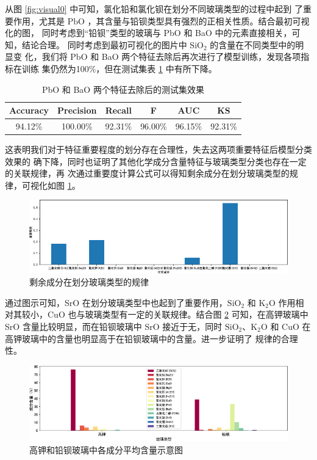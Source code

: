 \documentclass[withoutpreface,bwprint]{cumcmthesis} %
\begin{document}
从图 \ref{fig:visual0} 中可知，氯化铅和氯化钡在划分不同玻璃类型的过程中起到
了重要作用，尤其是
$\mathrm{PbO}$ ，其含量与铅钡类型具有强烈的正相关性质。结合最初可视化的图，
同时考虑到“铅钡”类型的玻璃与 PbO 和 BaO 中的元素直接相关，可知，结论合理。
同时考虑到最初可视化的图片中 $\mathrm{SiO_2}$ 的含量在不同类型中的明显变
化，我们将 PbO 和 BaO 两个特征去除后再次进行了模型训练，发现各项指标在训练
集仍然为100\%，但在测试集表 \ref{tab:test1} 中有所下降。
\begin{table}[!htb]
    \centering
    \begin{tabular}{|c|c|c|c|c|c|}
        \hline
        Accuracy & Precision & Recall  & F       & AUC     & KS      \\
        \hline
        94.12\%  & 100.00\%  & 92.31\% & 96.00\% & 96.15\% & 92.31\% \\
        \hline
    \end{tabular}
    \caption{PbO 和 BaO 两个特征去除后的测试集效果}
    \label{tab:test1}
\end{table}

这表明我们对于特征重要程度的划分存在合理性，失去这两项重要特征后模型分类效果的
确下降，同时也证明了其他化学成分含量特征与玻璃类型分类也存在一定的关联规律，再
次通过重要度计算公式可以得知剩余成分在划分玻璃类型的规律，可视化如图
\ref{fig:visual1}。
\begin{figure}[!htb]
    \centering
    \includegraphics{剩余成分在划分玻璃类型的规律.pdf}
    \caption{剩余成分在划分玻璃类型的规律}
    \label{fig:visual1}
\end{figure}

通过图示可知，SrO 在划分玻璃类型中也起到了重要作用，$\mathrm{SiO_2}$ 和 
$\mathrm{K_2O}$ 作用相
对其较小，CuO 也与玻璃类型有一定的关联规律。结合图 \ref{fig:averageContent}
可知，在高钾玻璃中 SrO 含量比较明显，而在铅钡玻璃中 SrO 接近于无，同时
 $\mathrm{SiO_2}$、$\mathrm{K_2O}$ 
和 CuO 在高钾玻璃中的含量也明显高于在铅钡玻璃中的含量。进一步证明了
规律的合理性。
\begin{figure}[!htb]
    \centering
    \includegraphics{高钾和铅钡玻璃中各成分平均含量示意图.pdf}
    \caption{高钾和铅钡玻璃中各成分平均含量示意图}
    \label{fig:averageContent}
\end{figure}
\end{document}
